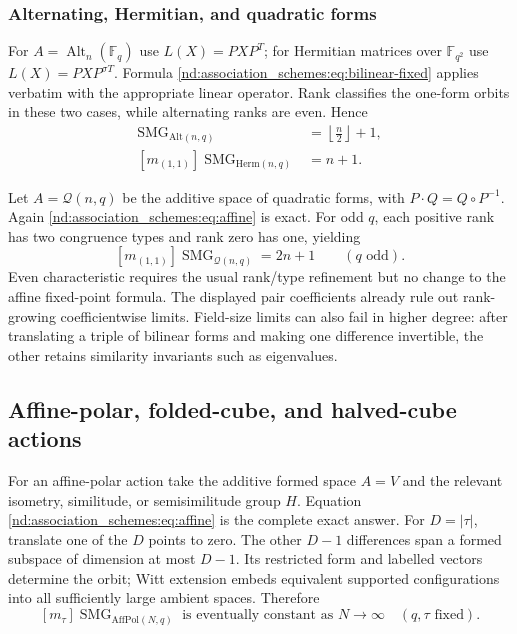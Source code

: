 \documentclass[10pt]{article}
\newcommand{\SMG}{\operatorname{SMG}}
\newcommand{\MGF}{\SMG}
\newcommand{\F}{\mathbb F}
\begin{document}
\subsubsection{Alternating, Hermitian, and quadratic forms}

For $A=\operatorname{Alt}_n(\F_q)$ use $L(X)=PXP^T$; for Hermitian matrices
over $\F_{q^2}$ use $L(X)=PXP^{\sigma T}$.  Formula \eqref{nd:association_schemes:eq:bilinear-fixed}
applies verbatim with the appropriate linear operator.  Rank classifies the
one-form orbits in these two cases, while alternating ranks are even.  Hence
\begin{align}
 [m_{(1,1)}]\MGF_{\mathrm{Alt}(n,q)}&=\left\lfloor\frac n2\right\rfloor+1,
 \label{nd:association_schemes:eq:alt-pair}\\
 [m_{(1,1)}]\MGF_{\mathrm{Herm}(n,q)}&=n+1.
 \label{nd:association_schemes:eq:herm-pair}
\end{align}

Let $A=\mathcal Q(n,q)$ be the additive space of quadratic forms, with
$P\cdot Q=Q\circ P^{-1}$.  Again \eqref{nd:association_schemes:eq:affine} is exact.  For odd $q$,
each positive rank has two congruence types and rank zero has one, yielding
\begin{equation}\label{nd:association_schemes:eq:quadratic-pair}
 \boxed{[m_{(1,1)}]\MGF_{\mathcal Q(n,q)}=2n+1\qquad(q\text{ odd}).}
\end{equation}
Even characteristic requires the usual rank/type refinement but no change to
the affine fixed-point formula.  The displayed pair coefficients already rule
out rank-growing coefficientwise limits.  Field-size limits can also fail in
higher degree: after translating a triple of bilinear forms and making one
difference invertible, the other retains similarity invariants such as
eigenvalues.

\subsection{Affine-polar, folded-cube, and halved-cube actions}

For an affine-polar action take the additive formed space $A=V$ and the
relevant isometry, similitude, or semisimilitude group $H$.  Equation
\eqref{nd:association_schemes:eq:affine} is the complete exact answer.  For $D=|\tau|$, translate one
of the $D$ points to zero.  The other $D-1$ differences span a formed subspace
of dimension at most $D-1$.  Its restricted form and labelled vectors
determine the orbit; Witt extension embeds equivalent supported configurations
into all sufficiently large ambient spaces.  Therefore
\begin{equation}\label{nd:association_schemes:eq:affpolar-stable}
 [m_\tau]\MGF_{\mathrm{AffPol}(N,q)}\text{ is eventually constant as }N\to\infty
 \quad(q,\tau\text{ fixed}).
\end{equation}
\end{document}
